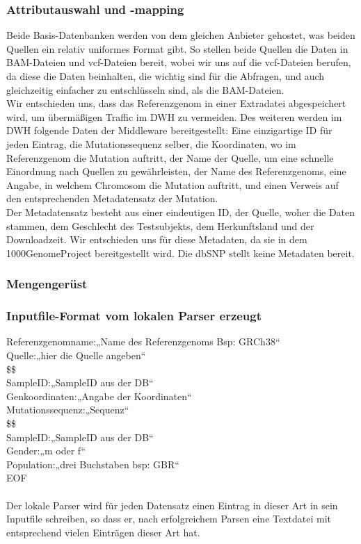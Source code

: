 \subsubsection{Attributauswahl und -mapping}
Beide Basis-Datenbanken werden von dem gleichen Anbieter gehostet, was beiden Quellen ein relativ uniformes Format gibt. So stellen beide Quellen die Daten in BAM-Dateien und vcf-Dateien bereit, wobei wir uns auf die vcf-Dateien berufen, da diese die Daten beinhalten, die wichtig sind für die Abfragen, und auch gleichzeitig einfacher zu entschlüsseln sind, als die BAM-Dateien.\\
Wir entschieden uns, dass das Referenzgenom in einer Extradatei abgespeichert wird, um übermäßigen Traffic im DWH zu vermeiden. Des weiteren werden im DWH folgende Daten der Middleware bereitgestellt: Eine einzigartige ID für jeden Eintrag, die Mutationssequenz selber, die Koordinaten, wo im Referenzgenom die Mutation auftritt, der Name der Quelle, um eine schnelle Einordnung nach Quellen zu gewährleisten, der Name des Referenzgenoms, eine Angabe, in welchem Chromosom die Mutation auftritt, und einen Verweis auf den entsprechenden Metadatensatz der Mutation.\\
Der Metadatensatz besteht aus einer eindeutigen ID, der Quelle, woher die Daten stammen, dem Geschlecht des Testsubjekts, dem Herkunftsland und der Downloadzeit. Wir entschieden uns für diese Metadaten, da sie in dem 1000GenomeProject bereitgestellt wird. Die dbSNP stellt keine Metadaten bereit. 
\subsubsection{Mengengerüst}




\subsubsection{Inputfile-Format vom lokalen Parser erzeugt}
Referenzgenomname:„Name des Referenzgenoms Bsp: GRCh38“\\
Quelle:„hier die Quelle angeben“\\
\$\$\\
SampleID:„SampleID aus der DB“\\
Genkoordinaten:„Angabe der Koordinaten“ \\
Mutationssequenz:„Sequenz“\\
\$\$\\
SampleID:„SampleID aus der DB“\\
Gender:„m oder f“\\
Population:„drei Buchstaben bsp: GBR“ \\
EOF\\
\\
Der lokale Parser wird für jeden Datensatz einen Eintrag in dieser Art in sein Inputfile schreiben, so dass er, nach erfolgreichem Parsen eine Textdatei mit entsprechend vielen Einträgen dieser Art hat.\\
